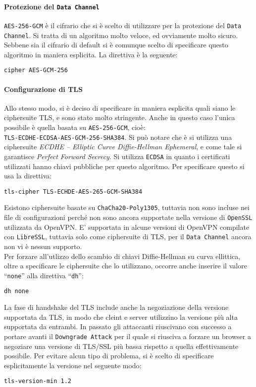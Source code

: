 \paragraph{Protezione del \texttt{Data Channel}}
\texttt{AES-256-GCM} è il cifrario che si è scelto di utilizzare per la protezione
del \texttt{Data Channel}. Si tratta di un algoritmo molto veloce, ed ovviamente
molto sicuro.
Sebbene sia il cifrario di default si è comunque scelto di specificare questo algoritmo in
maniera esplicita. La direttiva è la seguente:
\begin{verbatim}
cipher AES-GCM-256
\end{verbatim}

\paragraph{Configurazione di TLS}
Allo stesso modo, si è deciso di specificare in maniera esplicita quali siano
le ciphersuite TLS, e sono stato molto stringente. Anche in questo caso
l'unica possibile è quella basata su \texttt{AES-256-GCM}, cioè:\\
\texttt{TLS-ECDHE-ECDSA-AES-GCM-256-SHA384}.
Si può notare che è si utilizza una ciphersuite
\textit{ECDHE -- Elliptic Curve Diffie-Hellman Ephemeral}, e come tale si garantisce
\textit{Perfect Forward Secrecy}. Si utilizza \texttt{ECDSA} in quanto i certificati
utilizzati hanno chiavi pubbliche per questo algoritmo.
Per specificare questo si usa la direttiva:
\begin{verbatim}
tls-cipher TLS-ECHDE-AES-265-GCM-SHA384
\end{verbatim}
Esistono ciphersuite basate su \texttt{ChaCha20-Poly1305}, tuttavia non
sono incluse nei file di configurazioni perché non sono ancora supportate nella
versione di \texttt{OpenSSL} utilizzata da OpenVPN. E' supportata in alcune versioni
di OpenVPN compilate con \texttt{LibreSSL}, tuttavia solo come ciphersuite di TLS,
per il \texttt{Data Channel} ancora non vi è nessun supporto.\\
Per forzare all'utlizzo dello scambio di chiavi Diffie-Hellman su curva ellittica, oltre
a specificare le ciphersuite che lo utilizzano, occorre anche inserire il valore
``\texttt{none}'' alla direttiva ``\texttt{dh}'':
\begin{verbatim}
dh none
\end{verbatim}

La fase di handshake del TLS include anche la negoziazione della versione supportata
da TLS, in modo che cleint e server utilizzino la versione più alta supportata da entrambi.
In passato gli attaccanti riuscivano con successo a portare avanti il \texttt{Downgrade Attack}
per il quale si riusciva a forzare un browser a negoziare una versione di TLS/SSL
più bassa rispetto a quella effettivamente possibile. Per evitare alcun tipo
di problema, si è scelto di specificare esplicitamente la versione nel seguente modo:
\begin{verbatim}
tls-version-min 1.2
\end{verbatim}

